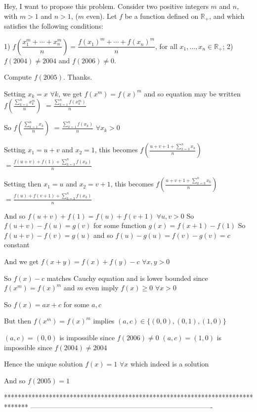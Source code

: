 \begin{solution}
	\begin{tcolorbox}Hey, I want to propose this problem. Consider two positive integers $m$ and $n$, with  $m > 1$ and $n>1$, ($m$ even).  Let $f$ be a function defined on $\mathbb{R}_+$, and which satisfies the following   conditions:

1) $f\left (\dfrac {x_1^m +\cdots+x_n^m} {n} \right) = \dfrac {f(x_1)^m +\cdots+f(x_n)^m} {n}$, for all $x_1, \ldots,x_n \in \mathbb{R}_+$; 
2) $f(2004)\neq  2004$ and $f(2006) \neq 0$. 

Compute  $f(2005)$. Thanks.\end{tcolorbox}
Setting $x_k=x$ $\forall k$, we get $f(x^m)=f(x)^m$ and so equation may be written $f\left(\frac{\sum_{k=1}^nx_k^m}n\right)$ $=\frac{\sum_{k=1}^nf(x_k^m)}n$

So $f\left(\frac{\sum_{k=1}^nx_k}n\right)$ $=\frac{\sum_{k=1}^nf(x_k)}n$ $\forall x_k>0$

Setting $x_1=u+v$ and $x_2=1$, this becomes $f\left(\frac{u+v+1+\sum_{k=3}^nx_k}n\right)$ $=\frac{f(u+v)+f(1)+\sum_{k=3}^nf(x_k)}n$

Setting then $x_1=u$ and $x_2=v+1$, this becomes $f\left(\frac{u+v+1+\sum_{k=3}^nx_k}n\right)$ $=\frac{f(u)+f(v+1)+\sum_{k=3}^nf(x_k)}n$

And so $f(u+v)+f(1)=f(u)+f(v+1)$ $\forall u,v>0$
So $f(u+v)-f(u)=g(v)$ for some function $g(x)=f(x+1)-f(1)$
So $f(u+v)-f(v)=g(u)$ and so $f(u)-g(u)=f(v)-g(v)=c$ constant

And we get $f(x+y)=f(x)+f(y)-c$ $\forall x,y>0$

So $f(x)-c$ matches Cauchy equation and is lower bounded since $f(x^m)=f(x)^m$ and $m$ even imply $f(x)\ge 0$ $\forall x>0$

So $f(x)=ax+c$ for some $a,c$

But then $f(x^m)=f(x)^m$ implies $(a,c)\in\{(0,0),(0,1),(1,0)\}$

$(a,c)=(0,0)$ is impossible since $f(2006)\ne 0$
$(a,c)=(1,0)$ is impossible since $f(2004)\ne 2004$

Hence the unique solution $f(x)=1$ $\forall x$ which indeed is a solution

And so $\boxed{f(2005)=1}$
\end{solution}
*******************************************************************************
-------------------------------------------------------------------------------

